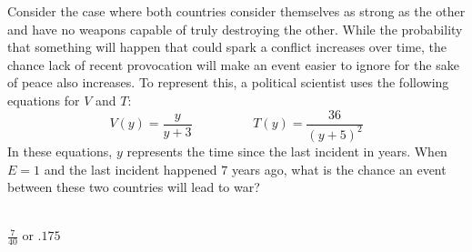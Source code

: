  
Consider the case where both countries consider themselves as strong as the other and have no weapons capable of truly destroying the other.  While the probability that something will happen that could spark a conflict increases over time, the chance lack of recent provocation will make an event easier to ignore for the sake of peace also increases.  To represent this, a political scientist uses the following equations for $V$ and $T$:
$$V(y)=\frac{y}{y+3} \hspace{2cm} T(y)=\frac{36}{(y+5)^2}$$
In these equations, $y$ represents the time since the last incident in years.  When $E=1$ and the last incident happened $7$ years ago, what is the chance an event between these two countries will lead to war?
\\\\


\ifsat
	\begin{enumerate}[label=\Alph*)]
	\end{enumerate}
\else
\fi

\ifacteven
	\begin{enumerate}[label=\textbf{\Alph*.},itemsep=\fill,align=left]
	\end{enumerate}
\else
\fi

\ifactodd
	\begin{enumerate}[label=\textbf{\Alph*.},itemsep=\fill,align=left]
	\end{enumerate}
\else
\fi

\ifgridin
$\frac{7}{40} $ or $.175 $
\else
\fi

